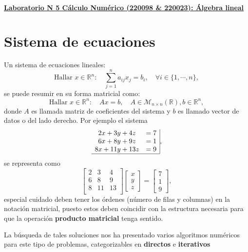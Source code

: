 \documentclass[12pt,letterpaper]{article}
\begin{document}
\hspace*{-1,5cm}

\vspace*{0.1cm} \centerline {\bf\underline{Laboratorio N 5 C\'alculo Num\'erico (220098 \& 220023): \'Algebra lineal}} \vskip0.5cm

\section{Sistema de ecuaciones}

Un sistema de ecuaciones lineales:
$$
\text{Hallar } x\in \mathbb{R}^n:\quad  \sum_{j=1}^{n} a_{ij}x_j=b_i ,\quad \forall i\in\{1,\cdots,n\} ,
$$
se puede resumir en su forma matricial como:
$$
\text{Hallar } x\in \mathbb{R}^n:\quad  A x = b ,\quad  A\in \mathcal{M}_{n\times n }(\mathbb{R}), b\in \mathbb{R}^n,
$$
donde $A$ es llamada matriz de coeficientes del sistema y $b$ es llamado vector de datos o del lado derecho. Por ejemplo el sistema
$$
\begin{array}{cc|}
2x+3y+4z & =7\\
6x+8y+9z & =1 \\
8x+11y+13z &=9\\ 
\hline
\end{array},
$$
se representa como
$$
\begin{bmatrix}
2 & 3& 4 \\
6 & 8& 9 \\
8& 11 & 13 \\
\end{bmatrix}
\begin{bmatrix}
x \\ y\\ z
\end{bmatrix}
= 
\begin{bmatrix}
7\\1\\9
\end{bmatrix},
$$
especial cuidado deben tener los \'ordenes (n\'umero de filas y columnas) en la notaci\'on matricial, puesto estos deben coincidir con la estructura necesaria para que la operaci\'on \textbf{producto matricial} tenga sentido.

La b\'usqueda de tales soluciones nos ha presentado varios algoritmos num\'ericos para este tipo de problemas, categorizables en \textbf{directos} e \textbf{iterativos}
\end{document}
